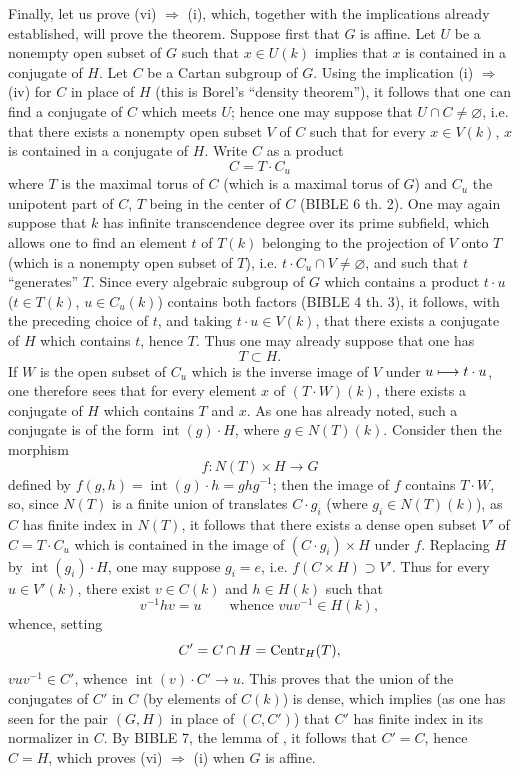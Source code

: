 Finally, let us prove (vi) $\Rightarrow$ (i), which, together with the
implications already established, will prove the theorem. Suppose first
that $G$ is affine. Let $U$ be a nonempty open subset of $G$ such that
$x\in U(k)$ implies that $x$ is contained in a conjugate of $H$. Let $C$
be a Cartan subgroup of $G$. Using the implication (i) $\Rightarrow$ (iv)
for $C$ in place of $H$ (this is Borel's ``density theorem''), it follows
that one can find a conjugate of $C$ which meets $U$; hence one may
suppose that $U\cap C\ne\varnothing$, i.e. that there exists a nonempty
open subset $V$ of $C$ such that for every $x\in V(k)$, $x$ is contained
in a conjugate of $H$. Write $C$ as a product
\[
 C=T\cdot C_u
\]
where $T$ is the maximal torus of $C$ (which is a maximal torus of $G$)
and $C_u$ the unipotent part of $C$, $T$ being in the center of $C$
(BIBLE 6 th. 2). One may again suppose that $k$ has infinite transcendence
degree over its prime subfield, which allows one to find an element $t$
of $T(k)$ belonging to the projection of $V$ onto $T$ (which is a nonempty
open subset of $T$), i.e. $t\cdot C_u\cap V\ne\varnothing$, and such
that $t$ ``generates'' $T$. Since every algebraic subgroup of $G$ which
contains a product $t\cdot u$ ($t\in T(k)$, $u\in C_u(k)$) contains both
factors (BIBLE 4 th. 3), it follows, with the preceding choice of $t$,
and taking $t\cdot u\in V(k)$, that there exists a conjugate of $H$ which
contains $t$, hence $T$. Thus one may already suppose that one has
\[
 T\subset H.
\]
If $W$ is the open subset of $C_u$ which is the inverse image of $V$
under $u\longmapsto t\cdot u$, one therefore sees that for every element $x$
of $(T\cdot W)(k)$, there exists a conjugate of $H$ which contains $T$
and $x$. As one has already noted, such a conjugate is of the form
$\operatorname{int}(g)\cdot H$, where $g\in N(T)(k)$. Consider then the
morphism
\[
 f:N(T)\times H\to G
\]
defined by $f(g,h)=\operatorname{int}(g)\cdot h=ghg^{-1}$; then the image
of $f$ contains $T\cdot W$, so, since $N(T)$ is a finite union of
translates $C\cdot g_i$ (where $g_i\in N(T)(k)$), as $C$ has finite
index in $N(T)$, it follows that there exists a dense open subset $V'$
of $C=T\cdot C_u$ which is contained in the image of $(C\cdot g_i)\times H$
under $f$. Replacing $H$ by $\operatorname{int}(g_i)\cdot H$, one may
suppose $g_i=e$, i.e. $f(C\times H)\supset V'$. Thus for every
$u\in V'(k)$, there exist $v\in C(k)$ and $h\in H(k)$ such that
\[
 v^{-1}hv=u\qquad\text{whence }vuv^{-1}\in H(k),
\]
whence, setting
\[
 C'=C\cap H=\operatorname{Centr}_H(T),
\]
$vuv^{-1}\in C'$, whence $\operatorname{int}(v)\cdot C'\to u$.
This proves that the union of the conjugates of $C'$ in $C$ (by elements
of $C(k)$) is dense, which implies (as one has seen for the pair $(G,H)$
in place of $(C,C')$) that $C'$ has finite index in its normalizer in $C$.
By BIBLE 7, the lemma of , it follows that $C'=C$, hence $C=H$, which
proves (vi) $\Rightarrow$ (i) when $G$ is affine.

